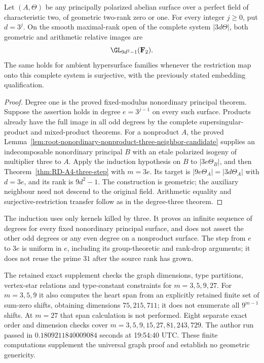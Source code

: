 \begin{corollary}
\label{cor:RD-A4-powers-three}
Let $(A,\Theta)$ be any principally polarized abelian surface over
a perfect field of characteristic two, of geometric two-rank zero
or one.  For every integer $j\ge0$, put $d=3^j$.
On the smooth maximal-rank open of the complete system
$|3d\Theta|$, both geometric and arithmetic relative images are
\[
                         \GL_{9d^2-1}(\mathbf F_2).
\]
The same holds for ambient hypersurface families whenever the
restriction map onto this complete system is surjective, with
the previously stated embedding qualification.
\end{corollary}
\begin{proof}
Degree one is the proved fixed-modulus nonordinary principal
theorem.  Suppose the assertion holds in degree $e=3^{j-1}$
on every such surface.  Products already have the full image in
all odd degrees by the complete supersingular-product and
mixed-product theorems.  For a nonproduct $A$, the proved
Lemma~\ref{lem:root-nonordinary-nonproduct-three-neighbor-candidate}
supplies an indecomposable nonordinary principal $B$ with an
etale polarized isogeny of multiplier three to $A$.
Apply the induction hypothesis on $B$ to $|3e\Theta_B|$, and
then Theorem~\ref{thm:RD-A4-three-step} with $m=3e$.
Its target is $|9e\Theta_A|=|3d\Theta_A|$ with $d=3e$,
and its rank is $9d^2-1$.  The construction is geometric;
the auxiliary neighbour need not descend to the original field.
Arithmetic equality and surjective-restriction transfer follow
as in the degree-three theorem.
\end{proof}

\begin{remark}
\label{rem:RD-A4-powers-three-scope}
The induction uses only kernels killed by three.  It proves an
infinite sequence of degrees for every fixed nonordinary principal
surface, and does not assert the other odd degrees or any even
degree on a nonproduct surface.  The step from $e$ to $3e$ is
uniform in $e$, including its group-theoretic and rank-drop
arguments; it does not reuse the prime $31$ after the source
rank has grown.

The retained exact supplement
checks the graph dimensions, type partitions, vertex-star relations
and type-constant constraints for $m=3,5,9,27$.  For $m=3,5,9$
it also computes the heart span from an explicitly retained finite
set of sum-zero shifts, obtaining dimensions $75,215,711$; it
does not enumerate all $9^{m-1}$ shifts.  At $m=27$ that span
calculation is not performed.  Eight separate exact order and
dimension checks cover $m=3,5,9,15,27,81,243,729$.  The author run
passed in $0.1809211840009084$ seconds at 19:54:40 UTC.
These finite computations supplement the universal graph proof
and establish no geometric genericity.
\end{remark}
